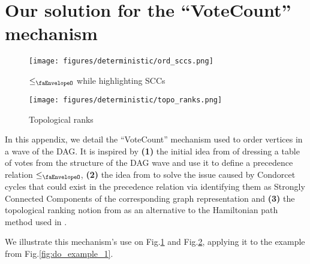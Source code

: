 

\section{Our solution for the ``VoteCount'' mechanism\label{anx:vote_count_mechanism}}


\begin{figure}[h]
    \centering
    \texttt{[image: figures/deterministic/ord\_sccs.png]}
    \caption{$\leq_{\text{\faEnvelopeO}}$ while highlighting SCCs}
    \label{fig:ord_graph_condensation}
\end{figure}


\begin{figure}[h]
    \centering
    \texttt{[image: figures/deterministic/topo\_ranks.png]}
    \caption{Topological ranks}
    \label{fig:ord_topological_ranks}
\end{figure}

In this appendix,
we detail the ``VoteCount'' mechanism used to order vertices in a wave of the DAG.
It is inspired by 
\textbf{(1)}
the initial idea from \cite{reducing_latency_of_dag_based_consensus_in_the_asynchronous_setting_via_the_utxo_model}
of dressing a table of votes from the structure of the DAG wave and use it to define a precedence relation $\leq_{\text{\faEnvelopeO}}$,
\textbf{(2)} the idea from \cite{order_fairness_for_byzantine_consensus,themis_fast_strong_order_fairness_in_byzantine_consensus} to solve the issue caused by Condorcet cycles that could exist in the precedence relation 
via identifying them as Strongly Connected Components of the corresponding graph representation 
and \textbf{(3)} the topological ranking notion from
\cite{diversified_top_k_graph_pattern_matching} as an alternative to the Hamiltonian path method used in \cite{themis_fast_strong_order_fairness_in_byzantine_consensus}.



We illustrate this mechanism's use on Fig.\ref{fig:ord_graph_condensation} and Fig.\ref{fig:ord_topological_ranks}, applying it to the example from Fig.\ref{fig:do_example_1}.


